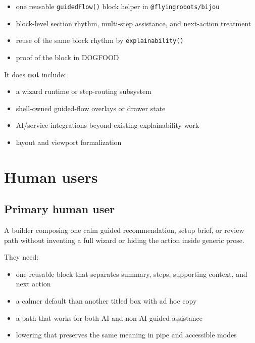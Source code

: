 \begin{itemize}
\tightlist
\item
  one reusable \texttt{g\allowbreak{}u\allowbreak{}i\allowbreak{}d\allowbreak{}e\allowbreak{}d\allowbreak{}F\allowbreak{}l\allowbreak{}o\allowbreak{}w\allowbreak{}(\allowbreak{})} block helper in \texttt{@\allowbreak{}f\allowbreak{}l\allowbreak{}y\allowbreak{}i\allowbreak{}n\allowbreak{}g\allowbreak{}r\allowbreak{}o\allowbreak{}b\allowbreak{}o\allowbreak{}t\allowbreak{}s\allowbreak{}/\allowbreak{}b\allowbreak{}i\allowbreak{}j\allowbreak{}o\allowbreak{}u}
\item
  block-level section rhythm, multi-step assistance, and next-action treatment
\item
  reuse of the same block rhythm by \texttt{e\allowbreak{}x\allowbreak{}p\allowbreak{}l\allowbreak{}a\allowbreak{}i\allowbreak{}n\allowbreak{}a\allowbreak{}b\allowbreak{}i\allowbreak{}l\allowbreak{}i\allowbreak{}t\allowbreak{}y\allowbreak{}(\allowbreak{})}
\item
  proof of the block in DOGFOOD
\end{itemize}

It does \textbf{not} include:

\begin{itemize}
\tightlist
\item
  a wizard runtime or step-routing subsystem
\item
  shell-owned guided-flow overlays or drawer state
\item
  AI/service integrations beyond existing explainability work
\item
  layout and viewport formalization
\end{itemize}

\section{Human users}\label{record-175-human-users}

\subsection{Primary human user}\label{record-175-primary-human-user}

A builder composing one calm guided recommendation, setup brief, or review path without inventing a full wizard or hiding the action inside generic prose.

They need:

\begin{itemize}
\tightlist
\item
  one reusable block that separates summary, steps, supporting context, and next action
\item
  a calmer default than another titled box with ad hoc copy
\item
  a path that works for both AI and non-AI guided assistance
\item
  lowering that preserves the same meaning in pipe and accessible modes
\end{itemize}

